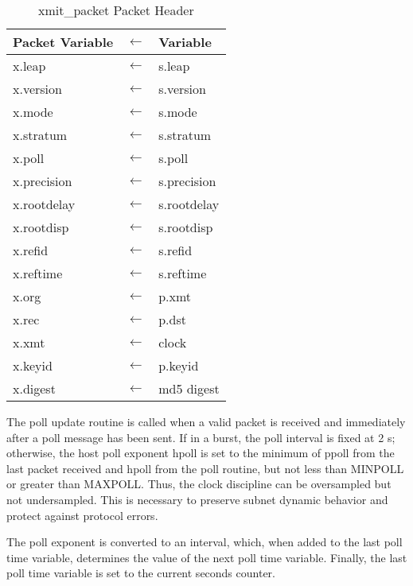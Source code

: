 \begin{table}[htb]
\center
\begin{tabular}{| l c l |}
\hline
Packet Variable & $ \leftarrow $ & Variable \\
\hline
\hline
x.leap      & $ \leftarrow $ & s.leap      \\
x.version   & $ \leftarrow $ & s.version   \\
x.mode      & $ \leftarrow $ & s.mode      \\
x.stratum   & $ \leftarrow $ & s.stratum   \\
x.poll      & $ \leftarrow $ & s.poll      \\
x.precision & $ \leftarrow $ & s.precision \\
x.rootdelay & $ \leftarrow $ & s.rootdelay \\
x.rootdisp  & $ \leftarrow $ & s.rootdisp  \\
x.refid     & $ \leftarrow $ & s.refid     \\
x.reftime   & $ \leftarrow $ & s.reftime   \\
x.org       & $ \leftarrow $ & p.xmt       \\
x.rec       & $ \leftarrow $ & p.dst       \\
x.xmt       & $ \leftarrow $ & clock       \\
x.keyid     & $ \leftarrow $ & p.keyid     \\
x.digest    & $ \leftarrow $ & md5 digest  \\
\hline
\end{tabular}
\caption{xmit\_packet Packet Header}
\label{xmit_packet_packet_header}
\end{table}

The poll update routine is called when a valid packet is received and
immediately after a poll message has been sent. If in a burst, the
poll interval is fixed at 2 s; otherwise, the host poll exponent
hpoll is set to the minimum of ppoll from the last packet received
and hpoll from the poll routine, but not less than MINPOLL or greater
than MAXPOLL. Thus, the clock discipline can be oversampled but not
undersampled. This is necessary to preserve subnet dynamic behavior
and protect against protocol errors.

The poll exponent is converted to an interval, which, when added to
the last poll time variable, determines the value of the next poll
time variable. Finally, the last poll time variable is set to the
current seconds counter.

